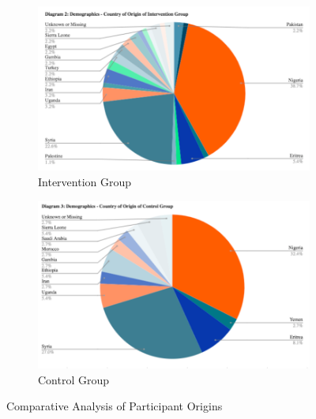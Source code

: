 \documentclass[12pt]{article}
\begin{document}
\begin{figure}[htbp]
    \centering
    \begin{subfigure}{0.5\textwidth}
        \centering
        \includegraphics[width=\linewidth]{pie-chart-1.png} %
        \caption{Intervention Group}
        \label{fig:pie-chart-1}
    \end{subfigure}%
    \begin{subfigure}{0.5\textwidth}
        \centering
        \includegraphics[width=\textwidth]{pie-chart-2.png} %
        \caption{Control Group}
        \label{fig:pie-chart-2}
    \end{subfigure}
    \caption{Comparative Analysis of Participant Origins}
\end{figure}
\end{document}
